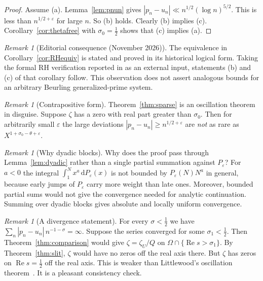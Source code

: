 \documentclass[12pt,letterpaper]{article}
\theoremstyle{definition}
\theoremstyle{remark}
\newtheorem{remark}[theorem]{Remark}
\numberwithin{equation}{section}
\newcommand{\Ree}{\operatorname{Re}}
\newcommand{\dd}{\,\mathrm{d}}
\newcommand{\eps}{\varepsilon}
\begin{document}
\begin{proof}
Assume (a). Lemma~\ref{lem:pnun} gives $|p_n-u_n|\ll n^{1/2}(\log
n)^{5/2}$. This is less than $n^{1/2+\eps}$ for large $n$. So (b) holds.
Clearly (b) implies (c). Corollary~\ref{cor:thetafree} with
$\sigma_0=\frac12$ shows that (c) implies (a).
\end{proof}

\begin{remark}[Editorial consequence (November 2026)]
\label{rem:rh-sparse-2026}
The equivalence in Corollary~\ref{cor:RHequiv} is stated and proved
in its historical logical form. Taking the formal RH verification
reported in \cite{LF26,Ru26} as an external input, statements (b)
and (c) of that corollary follow. This observation does not assert
analogous bounds for an arbitrary Beurling generalized-prime system.
\end{remark}

\begin{remark}[Contrapositive form]
Theorem~\ref{thm:sparse} is an oscillation theorem in disguise. Suppose
$\zeta$ has a zero with real part greater than $\sigma_0$. Then for
arbitrarily small $\eps$ the large deviations $|p_n-u_n|\ge n^{1/2+\eps}$
are \emph{not} as rare as $X^{1+\sigma_0-\theta+\eps}$.
\end{remark}

\begin{remark}[Why dyadic blocks]
Why does the proof pass through Lemma~\ref{lem:dyadic} rather than a single
partial summation against $P_\eps$? For $a<0$ the integral
$\int_1^N x^a\dd P_\eps(x)$ is not bounded by $P_\eps(N)N^a$ in general,
because early jumps of $P_\eps$ carry more weight than late ones. Moreover,
bounded partial sums would not give the convergence needed for analytic
continuation. Summing over dyadic blocks gives absolute and locally uniform
convergence.
\end{remark}

\begin{remark}[A divergence statement]
For every $\sigma<\frac12$ we have $\sum_n|p_n-u_n|\,n^{-1-\sigma}=\infty$.
Suppose the series converged for some $\sigma_1<\frac12$. Then
Theorem~\ref{thm:comparison} would give $\zeta=\zeta_U/Q$ on
$\Omega\cap\{\Ree s>\sigma_1\}$. By Theorem~\ref{thm:slit}, $\zeta$ would
have no zeros off the real axis there. But $\zeta$ has zeros on
$\Ree s=\frac12$ off the real axis. This is weaker than Littlewood's
oscillation theorem~\cite{Li14}. It is a pleasant consistency check.
\end{remark}
\end{document}
